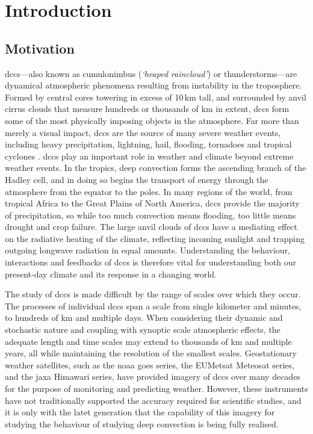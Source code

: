 \chapter{Introduction}

\section{Motivation}

\acrlong{dcc}s---also known as cumulonimbus (\textit{`heaped raincloud'}) or thunderstorms---are dynamical atmospheric phenomena resulting from instability in the troposphere.
Formed by central cores towering in excess of 10\,\unit{km} tall, and surrounded by anvil cirrus clouds that measure hundreds or thousands of km in extent, \acrshort{dcc}s form some of the most physically imposing objects in the atmosphere.
Far more than merely a visual impact, \acrshort{dcc}s are the source of many severe weather events, including heavy precipitation, lightning, hail, flooding, tornadoes and tropical cyclones \citep{westra_future_2014, houze_chapter_2014, williams_radar_1992, bruning_theory_2013, punge_hail_2016, matsudo_severe_2011}.
\acrshort{dcc}s play an important role in weather and climate beyond extreme weather events.
In the tropics, deep convection forms the ascending branch of the Hadley cell, and in doing so begins the transport of energy through the atmosphere from the equator to the poles.
In many regions of the world, from tropical Africa to the Great Plains of North America, \acrshort{dcc}s provide the majority of precipitation, so while too much convection means flooding, too little means drought and crop failure.
The large anvil clouds of \acrshort{dcc}s have a mediating effect on the radiative heating of the climate, reflecting incoming sunlight and trapping outgoing longwave radiation in equal amounts.
Understanding the behaviour, interactions and feedbacks of \acrshort{dcc}s is therefore vital for understanding both our present-day climate and its response in a changing world.

The study of \acrshort{dcc}s is made difficult by the range of scales over which they occur.
The processes of individual \acrshort{dcc}s span a scale from single kilometer and minutes, to hundreds of km and multiple days.
When considering their dynamic and stochastic nature and coupling with synoptic scale atmospheric effects, the adequate length and time scales may extend to thousands of km and multiple years, all while maintaining the resolution of the smallest scales.
Geostationary weather satellites, such as the \acrshort{noaa} \acrshort{goes} series, the EUMetsat Meteosat series, and the \acrshort{jaxa} Himawari series, have provided imagery of \acrshort{dcc}s over many decades for the purpose of monitoring and predicting weather.
However, these instruments have not traditionally supported the accuracy required for scientific studies, and it is only with the latet generation that the capability of this imagery for studying the behaviour of studying deep convection is being fully realised.

